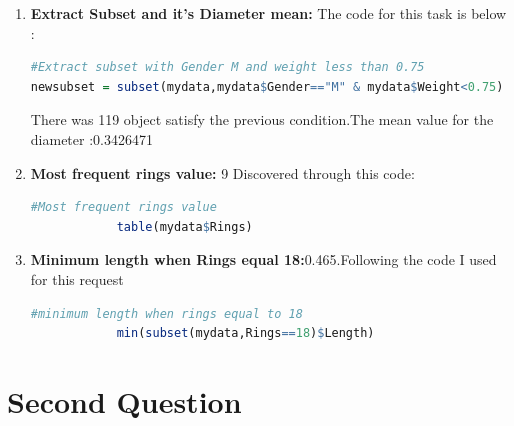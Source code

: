\documentclass{article}
\begin{document}
\begin{multicols*}{2}
\begin{enumerate}[label=\Alph*)]
		\item \textbf{Extract Subset and it's Diameter mean:} The code for this task is below : 
		\begin{lstlisting}[language=R]
#Extract subset with Gender M and weight less than 0.75
newsubset = subset(mydata,mydata$Gender=="M" & mydata$Weight<0.75)
		\end{lstlisting}
		There was 119 object satisfy the previous condition.The mean value for the diameter :0.3426471
		\item \textbf{Most frequent rings value:} 9 Discovered through this code:
		\begin{lstlisting}[language=R]
			#Most frequent rings value
			table(mydata$Rings)
		\end{lstlisting}
			\item \textbf{Minimum length when Rings equal 18:}0.465.Following the code I used for this request
			\begin{lstlisting}[language=R]
			#minimum length when rings equal to 18
			min(subset(mydata,Rings==18)$Length)
			\end{lstlisting}
	\end{enumerate}

{\centering\section*{Second Question}}


	\begin{flushleft}
\begin{enumerate}


\end{enumerate}
\end{flushleft}
\end{multicols*}
\end{document}

